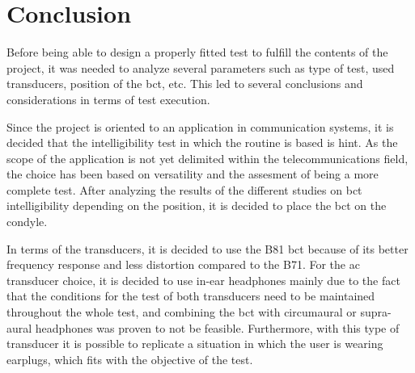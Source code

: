 \section{Conclusion}
Before being able to design a properly fitted test to fulfill the contents of the project, it was needed to analyze several parameters such as type of test, used transducers, position of the \gls{bct}, etc. This led to several conclusions and considerations in terms of test execution.

Since the project is oriented to an application in communication systems, it is decided that the intelligibility test in which the routine is based is \gls{hint}. As the scope of the application is not yet delimited within the telecommunications field, the choice has been based on versatility and the assesment of being a more complete test. After analyzing the results of the different studies on \gls{bct} intelligibility depending on the position, it is decided to place the \gls{bct} on the condyle.

In terms of the transducers, it is decided to use the B81 \gls{bct} because of its better frequency response and less distortion compared to the B71. For the \gls{ac} transducer choice, it is decided to use in-ear headphones mainly due to the fact that the conditions for the test of both transducers need to be maintained throughout the whole test, and combining the \gls{bct} with circumaural or supra-aural headphones was proven to not be feasible. Furthermore, with this type of transducer it is possible to replicate a situation in which the user is wearing earplugs, which fits with the objective of the test.


